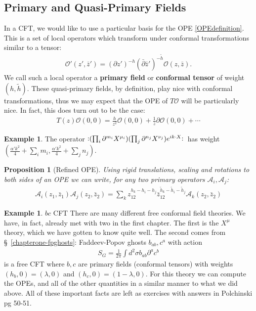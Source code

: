 \documentclass{report}
\theoremstyle{plain}
\newtheorem{proposition}[theorem]{Proposition}
\theoremstyle{definition}
\newtheorem{example}[theorem]{Example}
\theoremstyle{remark}
\newcommand{\FR}[2]{\frac{#1}{#2}}
\newcommand{\ms}{\mathscr}
\newcommand{\lam}{\lambda}
\newcommand{\sg}{\sigma}
\newcommand{\di}{\partial}
\newcommand{\NO}[1]{\vcentcolon\mathrel{#1}\vcentcolon\,}
\begin{document}
\subsection{Primary and Quasi-Primary Fields}
In a CFT, we would like to use a particular basis for the OPE
\eqref{OPEdefinition}. This is a set of local operators which transform
under conformal transformations similar to a tensor:
\begin{align}
    \ms O'(z',\bar z') = (\di z')^{-h}(\bar\di \bar z')^{-\tilde h} \ms
    O(z,\bar z).
    \label{primaryfielddefinition}
\end{align}
We call such a local operator a \textbf{primary field} or \textbf{conformal
tensor} of weight $(h,\tilde h)$. These quasi-primary fields, by
definition, play nice with conformal transformations, thus we may expect
that the OPE of $T\ms O$ will be particularly nice. In fact, this does turn
out to be the case:
\begin{align}
T(z)\ms O(0,0) = \FR{h}{z^2}\ms O(0,0) + \FR{1}{z}\di\ms O(0,0)+\cdots
\end{align}

\begin{example} The operator $\NO{(\prod_i\di^{m_i}X^{\mu_i})
(\prod_j\di^{n_j}X^{\nu_j})e^{ik\cdot X}}$ has weight $\left(
\FR{\alpha'k^2}{4} + \sum_i m_i, \FR{\alpha'k^2}{4} + \sum_j n_j \right)$.
\end{example}

\begin{proposition}[Refined OPE] Using rigid translations, scaling and
rotations to both sides of an OPE we can write, for any two primary
operators $\ms A_i, \ms A_j$:
\begin{align}
    \ms A_i(z_1,\bar z_1)\ms A_j(z_2,\bar z_2) = \sum_k
    z_{12}^{h_k-h_i-h_j}\bar z_{12}^{\tilde h_k-\tilde h_i-\tilde h_j}
    \ms A_k(z_2,\bar z_2)
    \label{refinedOPE}
\end{align}
\end{proposition}

\begin{example}{$bc$ CFT}
There are many different free conformal field theories. We have, in fact,
already met with two in the first chapter. The first is the $X^\mu$ theory,
which we have gotten to know quite well. The second comes from 
\S~\!\ref{chapterone-fpghosts}: Faddeev-Popov ghosts $b_{ab},c^a$ with
action \begin{align} S_G = \FR{1}{2\pi} \int d^2\sg b_{ab}\di^a c^b
\end{align} is a free CFT where $b,c$ are primary fields (conformal
tensors) with weights $(h_b,0) = (\lam,0)$ and $(h_c,0) = (1-\lam,0)$.
For this theory we can compute the OPEs, and all of the other quantities in
a similar manner to what we did above. All of these important facts are
left as exercises with answers in Polchinski pg 50-51.
\end{example}
\end{document}
